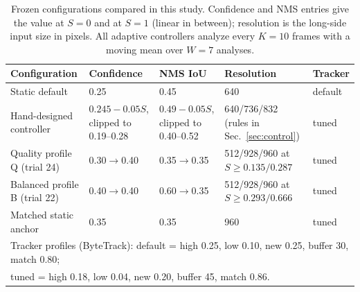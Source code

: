 \begin{table}[t]
\centering
\caption{Frozen configurations compared in this study. Confidence and NMS entries give the value at $S=0$ and at $S=1$ (linear in between); resolution is the long-side input size in pixels. All adaptive controllers analyze every $K=10$ frames with a moving mean over $W=7$ analyses.}
\label{tab:settings}
\small
\begin{tabular}{p{3.3cm}p{3.0cm}p{3.0cm}p{3.8cm}p{1.2cm}}
\hline
Configuration & Confidence & NMS IoU & Resolution & Tracker \\
\hline
Static default & 0.25 & 0.45 & 640 & default \\
Hand-designed controller & $0.245-0.05S$, clipped to 0.19--0.28 & $0.49-0.05S$, clipped to 0.40--0.52 & 640/736/832 (rules in Sec.~\ref{sec:control}) & tuned \\
Quality profile Q (trial 24) & 0.30$\to$0.40 & 0.35$\to$0.35 & 512/928/960 at $S\ge0.135/0.287$ & tuned \\
Balanced profile B (trial 22) & 0.40$\to$0.40 & 0.60$\to$0.35 & 512/928/960 at $S\ge0.293/0.666$ & tuned \\
Matched static anchor & 0.35 & 0.35 & 960 & tuned \\
\hline
\multicolumn{5}{l}{Tracker profiles (ByteTrack): default = high 0.25, low 0.10, new 0.25, buffer 30, match 0.80;}\\
\multicolumn{5}{l}{tuned = high 0.18, low 0.04, new 0.20, buffer 45, match 0.86.}\\
\hline
\end{tabular}
\end{table}

